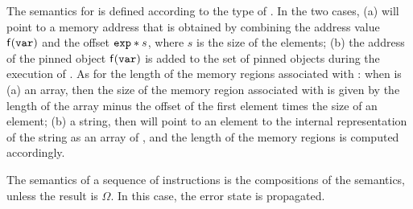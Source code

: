 \documentclass[10pt]{sigplanconf}
\begin{document}
The semantics for  is defined according to the type of
.  In the two cases, (a)  will point to a memory
address that is obtained by combining the address value
$\mathsf{f}(\mathtt{var})$ and the offset $\mathtt{exp} * s$, where $s$
is the size of the elements; (b) the address of the pinned object
$\mathsf{f}(\mathtt{var})$ is added to the set of pinned objects
during the execution of .  As for the length of the memory
regions associated with : when  is (a) an array,
then the size of the memory region associated with  is given
by the length of the array minus the offset of
the first element times the size of an element; (b) a string, then
 will point to an element to the internal representation of
the string as an array of , and the length of the memory
regions is computed accordingly.

The semantics of a sequence of instructions is the compositions of the
semantics, unless the result is $\Omega$.  In this case, the error
state is propagated.




\end{document}
